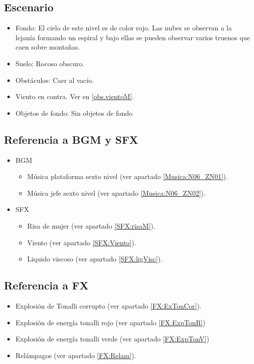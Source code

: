 \subsection{Escenario}
\begin{itemize} 
	\item Fondo: El cielo de este nivel es de color rojo. Las nubes se observan a la lejanía formando un espiral y bajo ellas se pueden observar varios truenos que caen sobre montañas.
	\item Suelo: Rocoso obscuro.
	\item Obstáculos: Caer al vacío.
	\item Viento en contra. Ver en \ref{obs.vientoM}.
	\item Objetos de fondo: Sin objetos de fondo
\end{itemize}	
	\subsection{Referencia a BGM y SFX}
	\begin{itemize}
		\item BGM
			\begin{itemize}
				\item Música plataforma sexto nivel (ver apartado \ref{Musica:N06_ZN01}).
				\item Música jefe sexto nivel (ver apartado \ref{Musica:N06_ZN02}).
			\end{itemize}
		\item SFX
		\begin{itemize}
			\item Risa de mujer (ver apartado \ref{SFX:risaM}).
			\item Viento (ver apartado \ref{SFX:Viento}).
			\item Liquido viscoso (ver apartado \ref{SFX:ligVisc}).
		\end{itemize}
	\end{itemize}
	\subsection{Referencia a FX}
	\begin{itemize}
		\item Explosión de Tonalli corrupto (ver apartado \ref{FX:ExTonCor}).
		\item Explosión de energía tonalli rojo (ver apartado \ref{FX:ExpTonR})
	\item Explosión de energía tonalli verde (ver apartado \ref{FX:ExpTonV})
	\item Relámpagos (ver apartado \ref{FX:Relam}).
	\end{itemize}
	